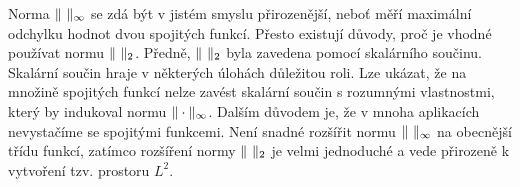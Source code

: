 Norma $\|\ \|_\infty$ se zdá být v jistém smyslu přirozenější, neboť měří maximální odchylku hodnot dvou spojitých funkcí.
Přesto existují důvody, proč je vhodné používat normu $\|\ \|_2$.
Předně, $\|\ \|_2$ byla zavedena pomocí skalárního součinu. Skalární součin hraje v některých úlohách důležitou roli.
Lze ukázat, že na množině spojitých funkcí nelze zavést skalární součin s rozumnými vlastnostmi, který by indukoval normu $\|\cdot\|_\infty$.
Dalším důvodem je, že v mnoha aplikacích nevystačíme se spojitými funkcemi. Není snadné rozšířit normu $\|\ \|_\infty$ na obecnější třídu funkcí, zatímco rozšíření normy $\|\ \|_2$ je velmi jednoduché a vede přirozeně k vytvoření tzv. prostoru $L^2$.





% 







